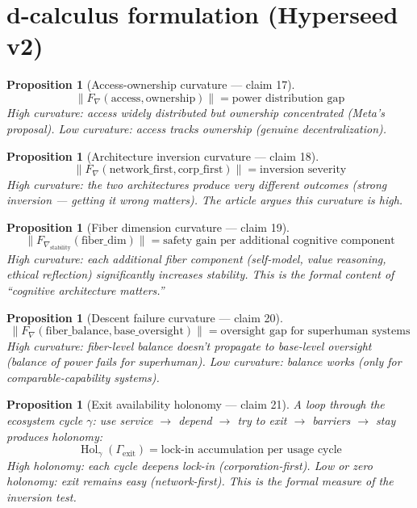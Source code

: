 \documentclass[11pt,a4paper]{article}
\newtheorem{proposition}[definition]{Proposition}
\begin{document}
\section{d-calculus formulation (Hyperseed v2)}

\begin{proposition}[Access-ownership curvature --- claim 17]
\label{prop:ao_curv}
\[
  \|F_\nabla(\text{access}, \text{ownership})\| = \text{power distribution gap}
\]
High curvature: access widely distributed but ownership concentrated
(Meta's proposal). Low curvature: access tracks ownership (genuine
decentralization).
\end{proposition}

\begin{proposition}[Architecture inversion curvature --- claim 18]
\label{prop:inv_curv}
\[
  \|F_\nabla(\text{network\_first}, \text{corp\_first})\| =
    \text{inversion severity}
\]
High curvature: the two architectures produce very different outcomes
(strong inversion --- getting it wrong matters). The article argues this
curvature is high.
\end{proposition}

\begin{proposition}[Fiber dimension curvature --- claim 19]
\label{prop:dim_curv}
\[
  \|F_{\nabla_{\text{stability}}}(\text{fiber\_dim})\| =
    \text{safety gain per additional cognitive component}
\]
High curvature: each additional fiber component (self-model, value
reasoning, ethical reflection) significantly increases stability. This
is the formal content of ``cognitive architecture matters.''
\end{proposition}

\begin{proposition}[Descent failure curvature --- claim 20]
\label{prop:desc_curv}
\[
  \|F_\nabla(\text{fiber\_balance}, \text{base\_oversight})\| =
    \text{oversight gap for superhuman systems}
\]
High curvature: fiber-level balance doesn't propagate to base-level
oversight (balance of power fails for superhuman). Low curvature:
balance works (only for comparable-capability systems).
\end{proposition}

\begin{proposition}[Exit availability holonomy --- claim 21]
\label{prop:exit_hol}
A loop through the ecosystem cycle $\gamma$: use service $\to$ depend
$\to$ try to exit $\to$ barriers $\to$ stay produces holonomy:
\[
  \operatorname{Hol}_\gamma(\Gamma_{\text{exit}}) = \text{lock-in
    accumulation per usage cycle}
\]
High holonomy: each cycle deepens lock-in (corporation-first). Low or
zero holonomy: exit remains easy (network-first). This is the formal
measure of the inversion test.
\end{proposition}
\end{document}
